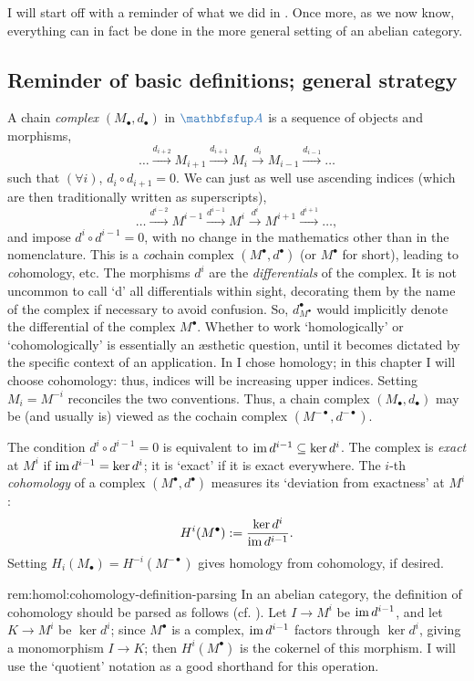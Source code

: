 I will start off with a reminder of what we did in
. Once more, as we
now know, everything can in fact be done in the more general setting
of an abelian category.

\subsection{Reminder of basic definitions; general strategy}
\label{subsec:homol:reminder-of-basic-definitions-general-strategy}

A chain \emph{complex} $(M_\bullet, d_\bullet)$ in $\categ{A}$ is a
sequence of objects and morphisms,
\[
  \dots \xrightarrow{d_{i+2}} M_{i+1} \xrightarrow{d_{i+1}} M_i
  \xrightarrow{d_i} M_{i-1} \xrightarrow{d_{i-1}} \dots
\]
such that $(\forall i)$, $d_i \circ d_{i+1} = 0$. We can just as well
use ascending indices (which are then traditionally written as
superscripts),
\[
  \dots \xrightarrow{d^{i-2}} M^{i-1} \xrightarrow{d^{i-1}} M^i
  \xrightarrow{d^i} M^{i+1} \xrightarrow{d^{i+1}} \dots,
\]
and impose $d^i \circ d^{i-1} = 0$, with no change in the mathematics
other than in the nomenclature. This is a \emph{co}chain complex
$(M^\bullet, d^\bullet)$ (or $M^\bullet$ for short), leading to
\emph{co}homology, etc. The morphisms $d^i$ are the
\emph{differentials} of the complex. It is not uncommon to call `d'
all differentials within sight, decorating them by the name of the
complex if necessary to avoid confusion. So, $d^\bullet_{M^\bullet}$
would implicitly denote the differential of the complex $M^\bullet$.
Whether to work `homologically' or `cohomologically' is essentially an
æsthetic question, until it becomes dictated by the specific context
of an application. In  I
chose homology; in this chapter I will choose cohomology: thus,
indices will be increasing upper indices. Setting $M_i = M^{-i}$
reconciles the two conventions.  Thus, a chain complex
$(M_\bullet, d_\bullet)$ may be (and usually is) viewed as the cochain
complex $(M^{-\bullet}, d^{-\bullet})$.

The condition $d^i \circ d^{i-1} = 0$ is equivalent to
$\operatorname{im} d^{i-1} \subseteq \ker d^i$. The complex is \emph{exact} at
$M^i$ if $\operatorname{im} d^{i-1} = \ker d^i$; it is `exact' if it is exact
everywhere. The $i$-th \emph{cohomology} of a complex
$(M^\bullet, d^\bullet)$ measures its `deviation from exactness' at
$M^i$:
\[
  H^i(M^\bullet) := \frac{\ker d^i}{\operatorname{im} d^{i-1}}.
\]
Setting $H_i(M_\bullet) = H^{-i}(M^{-\bullet})$ gives homology from
cohomology, if desired.
\begin{rem}{}{rem:homol:cohomology-definition-parsing}
  In an abelian category, the definition of cohomology should be
  parsed as follows (cf. ). Let $I \to M^i$ be
  $\operatorname{im} d^{i-1}$, and let $K \to M^i$ be $\ker d^i$; since
  $M^\bullet$ is a complex, $\operatorname{im} d^{i-1}$ factors through
  $\ker d^i$, giving a monomorphism $I \to K$; then $H^i(M^\bullet)$
  is the cokernel of this morphism. I will use the `quotient' notation
  as a good shorthand for this operation.
\end{rem}

